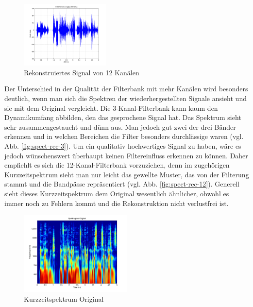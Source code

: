 \documentclass[conference]{IEEEtran}
\begin{document}
\begin{compactenum}[a)]
\begin{figure}[h!]
	\vspace{-5pt}
	\centering
	\includegraphics[width=0.4\textwidth]{img/sig_rec_12.png}
	\vspace{-10pt}
	\caption{Rekonstruiertes Signal von 12 Kanälen}
	\vspace{-10pt}
	\label{fig:sig-rec-12}
\end{figure}
\newpage
\item Der Unterschied in der Qualität der Filterbank mit mehr Kanälen wird besonders deutlich, wenn man sich die Spektren der wiederhergestellten Signale ansieht und sie mit dem Original vergleicht. Die 3-Kanal-Filterbank kann kaum den Dynamikumfang abbilden, den das gesprochene Signal hat. Das Spektrum sieht sehr zusammengestaucht und dünn aus. Man jedoch gut zwei der drei Bänder erkennen und in welchen Bereichen die Filter besonders durchlässige waren (vgl. Abb. \ref{fig:spect-rec-3}). Um ein qualitativ hochwertiges Signal zu haben, wäre es jedoch wünschenswert überhaupt keinen Filtereinfluss erkennen zu können. Daher empfiehlt es sich die 12-Kanal-Filterbank vorzuziehen, denn im zugehörigen Kurzzeitspektrum sieht man nur leicht das gewellte Muster, das von der Filterung stammt und die Bandpässe repräsentiert (vgl. Abb. \ref{fig:spect-rec-12}). Generell sieht dieses Kurzzeitspektrum dem Original wesentlich ähnlicher, obwohl es immer noch zu Fehlern kommt und die Rekonstruktion nicht verlustfrei ist. 
\begin{figure}[h!]
	\centering
	\includegraphics[width=0.5\textwidth]{img/spect_orig.png}
	\caption{Kurzzeitspektrum Original}
	\label{fig:spect-orig}
\end{figure}


\end{compactenum}
\end{document}
